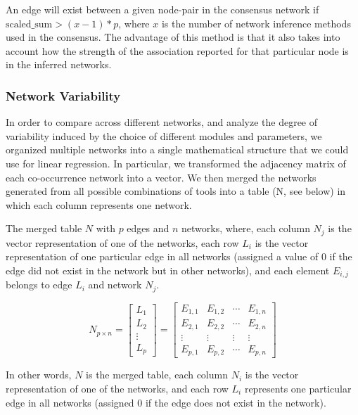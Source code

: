   An edge will exist between a given node-pair in the consensus network if \(\text{scaled\_sum} > (x - 1) * p\), where \(x\) is the number of network inference methods used in the consensus. The advantage of this method is that it also takes into account how the strength of the association reported for that particular node is in the inferred networks.

  \subsubsection*{Network Variability}
  \vspace{-5mm}
 In order to compare across different networks, and analyze the degree of variability induced by the choice of different modules and parameters, we organized multiple networks into a single mathematical structure that we could use for linear regression.
 In particular, we transformed the adjacency matrix of each co-occurrence network into a vector.
 We then merged the networks generated from all possible combinations of tools into a table (N, see below) in which each column represents one network.

 The merged table $N$ with $p$ edges and $n$ networks, where, each column $N_j$ is the vector representation of one of the networks, each row $L_i$ is the vector representation of one particular edge in all networks (assigned a value of 0 if the edge did not exist in the network but in other networks), and each element $E_{i,j}$ belongs to edge $L_i$ and network $N_j$.

  \begin{equation*}
   N_{p \times n} =
   \begin{bmatrix}
     L_1 \\
     L_2 \\
     \vdots \\
     L_p
   \end{bmatrix}
   =
   \begin{bmatrix}
     E_{1,1} & E_{1,2} & \cdots  & E_{1, n} \\
     E_{2,1} & E_{2,2} & \cdots  & E_{2, n} \\
     \vdots & \vdots & \vdots  & \vdots \\
     E_{p,1} & E_{p,2} & \cdots  & E_{p, n}
   \end{bmatrix}
  \end{equation*}

  In other words, $N$ is the merged table, each column $N_i$ is the vector representation of one of the networks, and each row $L_i$ represents one particular edge in all networks (assigned 0 if the edge does not exist in the network).

